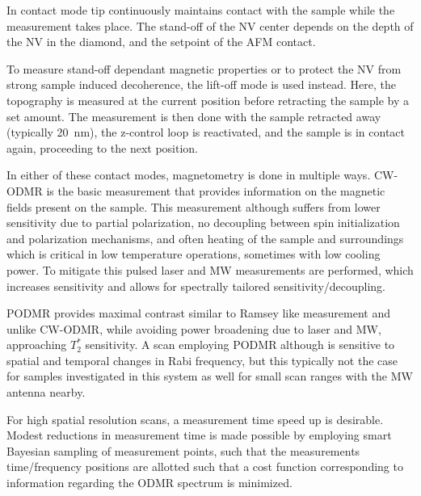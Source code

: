 In contact mode tip continuously maintains contact with the sample while the measurement takes place. The stand-off of the \gls{NV} center depends on the depth of the \gls{NV} in the diamond, and the setpoint of the \gls{AFM} contact\cite{xuMinimizingSensorSampleDistances2025}. 

To measure stand-off dependant magnetic properties or to protect the \gls{NV} from strong sample induced decoherence, the lift-off mode is used instead. Here, the topography is measured at the current position before retracting the sample by a set amount. The measurement is then done with the sample retracted away (typically \qty{20}{\nano\meter}), the z-control loop is reactivated, and the sample is in contact again, proceeding to the next position.

In either of these contact modes, magnetometry is done in multiple ways. \gls{CW}-\gls{ODMR} is the basic measurement that provides information on the magnetic fields present on the sample\cite{barrySensitivityOptimizationNVdiamond2020}. This measurement although suffers from lower sensitivity due to partial polarization, no decoupling between spin initialization and polarization mechanisms, and often heating of the sample and surroundings which is critical in low temperature operations, sometimes with low cooling power. To mitigate this pulsed laser and \gls{MW} measurements are performed, which increases sensitivity and allows for spectrally tailored sensitivity/decoupling.

\gls{PODMR} provides maximal contrast similar to Ramsey like measurement and unlike \gls{CW}-\gls{ODMR}, while avoiding power broadening due to laser and \gls{MW}, approaching $T_2^*$ sensitivity\cite{dreauAvoidingPowerBroadening2011,barrySensitivityOptimizationNVdiamond2020}. A scan employing \gls{PODMR} although is sensitive to spatial and temporal changes in Rabi frequency, but this typically not the case for samples investigated in this system as well for small scan ranges with the \gls{MW} antenna nearby. 

For high spatial resolution scans, a measurement time speed up is desirable. Modest reductions in measurement time is made possible by employing smart Bayesian sampling of measurement points, such that the measurements time/frequency positions are allotted such that a cost function corresponding to information regarding the \gls{ODMR} spectrum is minimized\cite{dushenkoSequentialBayesianExperiment2020}. 

